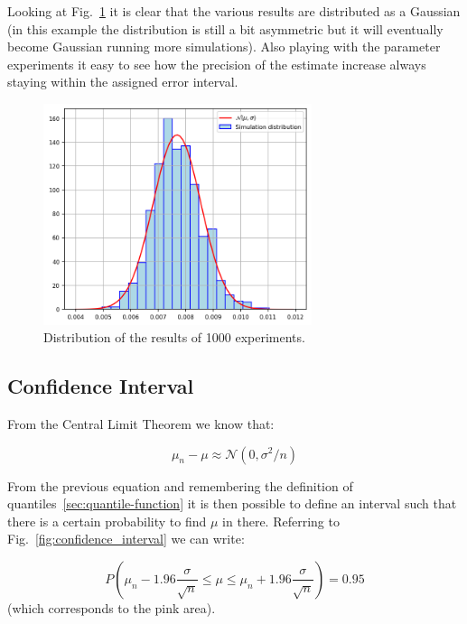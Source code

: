 Looking at Fig.~\ref{fig:repeated_MC} it is clear that the various results are distributed as a Gaussian (in this example the distribution is still a bit asymmetric but it will eventually become Gaussian running more simulations). Also playing with the parameter experiments it easy to see how the precision of the estimate increase always staying within the assigned error interval.

\begin{figure}[htb]
\centering
\includegraphics[width=0.7\textwidth]{figures/experiment_distribution}
\caption{Distribution of the results of 1000 experiments.}
\label{fig:repeated_MC}
\end{figure}

\subsection{Confidence Interval}

From the Central Limit Theorem we know that: 

\begin{equation}
\mu_n - \mu \approx \mathcal{N}(0, \sigma^2/n)
\end{equation}

From the previous equation and remembering the definition of quantiles~\ref{sec:quantile-function} it is then possible to define an interval such that there is a certain probability to find $\mu$ in there. Referring to Fig.~\ref{fig:confidence_interval} we can write:

\begin{equation}
P\left(\mu_n - 1.96\frac{\sigma}{\sqrt{n}}\le \mu \le \mu_n + 1.96\frac{\sigma}{\sqrt{n}}\right) = 0.95
\end{equation}
(which corresponds to the pink area).

